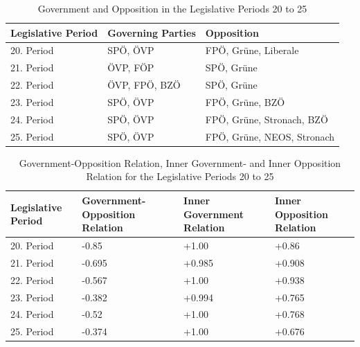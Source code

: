 \begin{table}[h]

\centering
\bgroup
\def\arraystretch{1.2}
\begin{tabular}{| l | l | l |}
\hline
  Legislative Period & Governing Parties & Opposition  \\
\hline
\hline
  20. Period & SPÖ, ÖVP & FPÖ, Grüne, Liberale \\
\hline
  21. Period & ÖVP, FÖP & SPÖ, Grüne \\
\hline
  22. Period & ÖVP, FPÖ, BZÖ & SPÖ, Grüne \\
\hline
  23. Period & SPÖ, ÖVP & FPÖ, Grüne, BZÖ \\
\hline
  24. Period & SPÖ, ÖVP & FPÖ, Grüne, Stronach, BZÖ \\
\hline
  25. Period & SPÖ, ÖVP & FPÖ, Grüne, NEOS, Stronach \\
\hline

\end{tabular}
\egroup
\caption{Government and Opposition in the Legislative Periods 20 to 25}
\label{table:gov_opp_parties}
\end{table}



\begin{table}[h]

\centering
\bgroup
\def\arraystretch{1.2}
\begin{tabular}{| p{2cm} | p{3cm} | p{3cm} | p{3cm} |}
\hline
  Legislative Period & Government-Opposition Relation & Inner Government Relation & Inner Opposition Relation \\
\hline
\hline
  20. Period & -0.85 & +1.00 & +0.86 \\
\hline
  21. Period & -0.695 & +0.985 & +0.908 \\
\hline
  22. Period & -0.567 & +1.00 & +0.938 \\
\hline
  23. Period & -0.382 & +0.994 & +0.765\\
\hline
  24. Period & -0.52 & +1.00 & +0.768\\
\hline
  25. Period & -0.374 & +1.00 & +0.676\\
\hline

\end{tabular}
\egroup
\caption{Government-Opposition Relation, Inner Government- and Inner Opposition Relation for the Legislative Periods 20 to 25}
\label{table:gov_opp_relation}
\end{table}